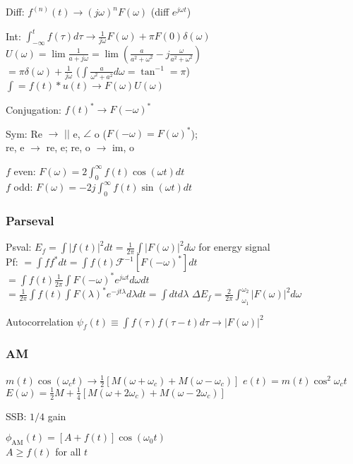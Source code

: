 \documentclass[4pt]{article}
\theoremstyle{definition}
\theoremstyle{definition}
\renewcommand{\o}{\omega}
\newcommand{\ra}{\rightarrow}
\begin{document}
    Diff: \(f^{(n)}(t) \ra (j\o)^nF(\o)\) (diff $e^{j\o t}$)    %
    
    Int: \(\int_{-\infty}^t f(\tau)d\tau \ra \frac{1}{j\o}F(\o) + \pi F(0) \delta(\o)\)\\
    \(U(\o) = \lim \frac{1}{a+j\o} = \lim (\frac{a}{a^2+\o^2} - j\frac{\o}{a^2+\o^2}) \) \\
    \(= \pi\delta(\o) + \frac{1}{j\o}\) ($\int \frac{a}{\o^2+a^2}d\o = \tan^{-1}=\pi$)\\
    $\int = f(t) * u(t) \ra F(\o)U(\o)$

    Conjugation: \(f(t)^* \ra F(-\o)^*\)   %

    Sym: Re $\ra$ $||$ e, $\angle$ o ($F(-\o) = F(\o)^*$);\\
    re, e $\ra$ re, e; re, o $\ra$ im, o

    $f$ even: \(F(\o) = 2\int_0^{\infty} f(t)\cos(\o t) dt\)\\
    $f$ odd: \(F(\o) = -2j\int_0^{\infty} f(t) \sin(\o t) dt\)

\subsubsection{Parseval}
    Psval: \(E_f = \int |f(t)|^2 dt = \frac{1}{2\pi} \int |F(\omega)|^2 d\o\)  for energy signal\\  %
    Pf: \(= \int f f^* dt = \int f(t)\mathcal F ^{-1}[F(-\o)^*]dt\)\\
    \(= \int f(t) \frac{1}{2\pi} \int F(-\o)^* e^{j\o t} d\o dt\)\\
    \(= \frac{1}{2\pi}\int f(t) \int F(\lambda)^* e^{-jt\lambda} d\lambda dt = \int dt d\lambda\)
    \(\Delta E_f = \frac{2}{2\pi}\int^{\o_2}_{\o_1} |F(\o)|^2 d\o\) %

    Autocorrelation \(\psi_f(t) \equiv \int f(\tau)f(\tau-t)d\tau \ra |F(\o)|^2\)   %
\subsubsection{AM}
    \(m(t) \cos(\o_c t) \ra \frac{1}{2}[M(\o + \o_c) + M(\o - \o_c)]\)     %
    \(e(t) = m(t)\cos^2 \o_c t\)  \\          %
    \(E(\o) = \frac{1}{2} M + \frac{1}{4}[M(\o + 2\o_c) + M(\o - 2\o_c)]\)

    SSB: $1/4$ gain

    \(\phi_\mathrm{AM} (t) = [A + f(t)] \cos (\omega_0 t)\)\\
    $A \geq f(t)$ for all $t$
\end{document}

